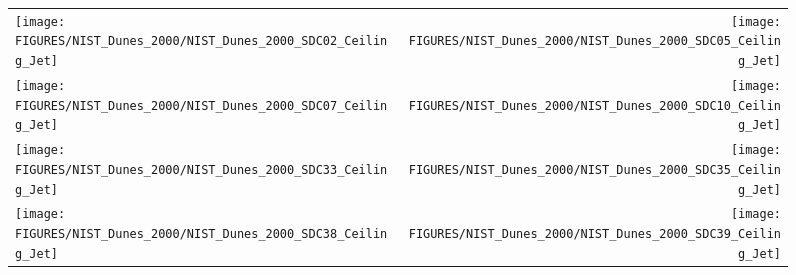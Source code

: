 \begin{figure}[h!]
\begin{tabular*}{\textwidth}{l@{\extracolsep{\fill}}r}
\texttt{[image: FIGURES/NIST\_Dunes\_2000/NIST\_Dunes\_2000\_SDC02\_Ceiling\_Jet]} &
\texttt{[image: FIGURES/NIST\_Dunes\_2000/NIST\_Dunes\_2000\_SDC05\_Ceiling\_Jet]} \\
\texttt{[image: FIGURES/NIST\_Dunes\_2000/NIST\_Dunes\_2000\_SDC07\_Ceiling\_Jet]} &
\texttt{[image: FIGURES/NIST\_Dunes\_2000/NIST\_Dunes\_2000\_SDC10\_Ceiling\_Jet]} \\
\texttt{[image: FIGURES/NIST\_Dunes\_2000/NIST\_Dunes\_2000\_SDC33\_Ceiling\_Jet]} &
\texttt{[image: FIGURES/NIST\_Dunes\_2000/NIST\_Dunes\_2000\_SDC35\_Ceiling\_Jet]} \\
\texttt{[image: FIGURES/NIST\_Dunes\_2000/NIST\_Dunes\_2000\_SDC38\_Ceiling\_Jet]} &
\texttt{[image: FIGURES/NIST\_Dunes\_2000/NIST\_Dunes\_2000\_SDC39\_Ceiling\_Jet]}
\end{tabular*}
\label{NIST_Dunes_2000_Ceiling_Jet}
\end{figure}

\clearpage




